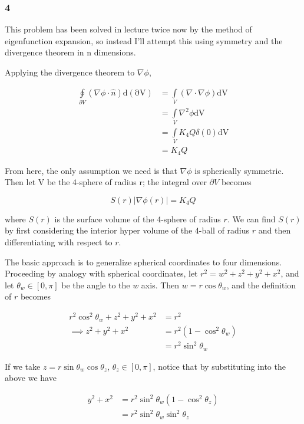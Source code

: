 \documentclass[12pt]{article}
\begin{document}
\subsubsection*{4}

This problem has been solved in lecture twice now by the method of eigenfunction expansion, so instead I'll attempt this using symmetry and the divergence theorem in n dimensions.

Applying the divergence theorem to \(\nabla\phi\),

\begin{align*}
\oint\limits_{\partial V} (\nabla\phi \cdot \hat{n}) \mathrm{d (\partial V)} &= \int\limits_{V} (\nabla \cdot \nabla\phi)\mathrm{dV}\\
&= \int\limits_{V} \nabla^2\phi\mathrm{dV}\\
&= \int\limits_{V} K_4 Q \delta(0)\mathrm{dV}\\
&= K_4Q
\end{align*}

From here, the only assumption we need is that \(\nabla\phi\) is spherically symmetric. Then let V be the 4-sphere of radius r; the integral over \(\partial V\) becomes

\[S(r)|\nabla\phi(r)| = K_4 Q
\]

where \(S(r)\) is the surface volume of the 4-sphere of radius \(r\). We can find \(S(r)\) by first considering the interior hyper volume of the 4-ball of radius \(r\) and then differentiating with respect to \(r\).

The basic approach is to generalize spherical coordinates to four dimensions. Proceeding by analogy with spherical  coordinates, let \(r^2 = w^2 + z^2 + y^2 + x^2\), and let \( \theta_w \in [0,\pi]\) be the angle to the \(w\) axis. Then \(w = r \cos \theta_w \), and the definition of \(r\) becomes

\begin{align*}
 r^2\cos^2\theta_w + z^2 + y^2 + x^2 &= r^2 \\
 \implies z^2 + y^2 + x^2 &= r^2(1-\cos^2\theta_w) \\
 &= r^2\sin^2\theta_w
\end{align*} 

If we take \(z = r\sin\theta_w\cos\theta_z\), \(\theta_z \in [0,\pi]\), notice that by substituting into the above we have

\begin{align*}
y^2 + x^2  &= r^2\sin^2\theta_w(1-\cos^2\theta_z) \\
&= r^2\sin^2\theta_w\sin^2\theta_z
\end{align*}
\end{document}
